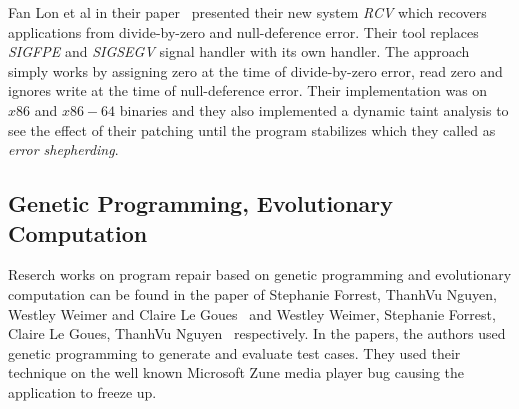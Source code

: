 Fan Lon et al in their paper~\cite{conf/pldi/LongSR14} presented their new
system \emph{RCV} which recovers applications from divide-by-zero and
null-deference error. Their tool replaces \emph{SIGFPE} and \emph{SIGSEGV}
signal handler with its own handler. The approach simply works by assigning zero
at the time of divide-by-zero error, read zero and ignores write at the time of
null-deference error. Their implementation was on $x86$ and $x86-64$ binaries
and they also implemented a dynamic taint analysis to see the effect of
their
patching until the program stabilizes which they called as \emph{error
shepherding}.

\subsection{Genetic Programming, Evolutionary Computation}
\label{subsec:RecWorksGeneric}

Reserch works on program repair based on genetic programming and evolutionary
computation can be found in the paper of Stephanie Forrest, ThanhVu Nguyen,
Westley Weimer and Claire Le Goues~\cite{conf/gecco/2009g} and Westley Weimer,
Stephanie Forrest, Claire Le Goues, ThanhVu
Nguyen~\cite{journals/cacm/WeimerFGN10} respectively. In the papers, the authors
used genetic programming to generate and evaluate test cases. They used their
technique on the well known Microsoft Zune media player bug causing the
application to freeze up.



